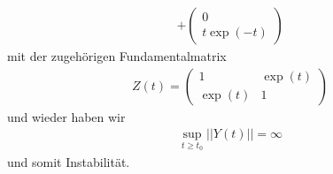 \begin{solution}
\begin{enumerate}[label = \textbf{\alph*)}]
\begin{align*}
    + \begin{pmatrix}
      0 \\ t\exp(-t)
    \end{pmatrix}
  \end{align*}
  mit der zugehörigen Fundamentalmatrix
  \begin{align*}
    Z(t) = \begin{pmatrix}
      1 & \exp(t) \\
      \exp(t) & 1
    \end{pmatrix}
  \end{align*}
  und wieder haben wir
  \begin{align*}
    \sup_{t \geq t_0} ||Y(t)|| = \infty
  \end{align*}
  und somit Instabilität.
\end{enumerate}
\end{solution}
